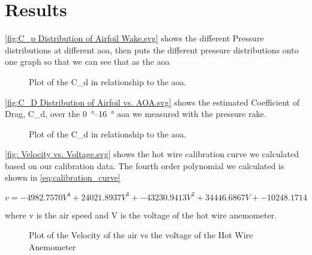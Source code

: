 \chapter{Results}
\label{cp:results}

\autoref{fig:C_p Distribution of Airfoil Wake.svg} shows the different Pressure distributions at different \acrshort{aoa}, then puts the different pressure distributions onto one graph so that we can see that as the \acrshort{aoa} 

\begin{figure}[htpb]
    \centering
    
    \caption[Plot of the \gls{C_d} in relationship to the \acrshort{aoa}.]{Plot of the \gls{C_d} in relationship to the \acrshort{aoa}.}
    \label{fig:C_p Distribution of Airfoil Wake.svg}
\end{figure}


\newpage

\autoref{fig:C_D Distribution of Airfoil vs. AOA.svg} shows the estimated Coefficient of Drag, \gls{C_d}, over the \qtyrange{0}{16}{\degree} \acrshort{aoa} we measured with the pressure rake.

\begin{figure}[htpb]
    \centering
    
    \caption[Plot of the \gls{C_d} in relationship to the \acrshort{aoa}.]{Plot of the \gls{C_d} in relationship to the \acrshort{aoa}.}
    \label{fig:C_D Distribution of Airfoil vs. AOA.svg}
\end{figure}

\autoref{fig: Velocity vs. Voltage.svg} shows the hot wire calibration curve we calculated based on our calibration data. The fourth order polynomial we calculated is shown in \autoref{eq:calibration_curve}

\begin{equation} \label{eq:calibration_curve}
    v = -4982.7570V^4 + 24021.8937V^3 + -43230.9413V^2 + 34446.6867V + -10248.1714
\end{equation}

\noindent where \gls{v} is the air speed and \gls{V} is the voltage of the hot wire anemometer.

\begin{figure}[htpb]
    \centering
    
    \caption[Plot of the Velocity of the air vs the voltage of the  Hot Wire Anemometer]{Plot of the Velocity of the air vs the voltage of the  Hot Wire Anemometer}
    \label{fig: Velocity vs. Voltage.svg}
    \vspace*{4in}
\end{figure}